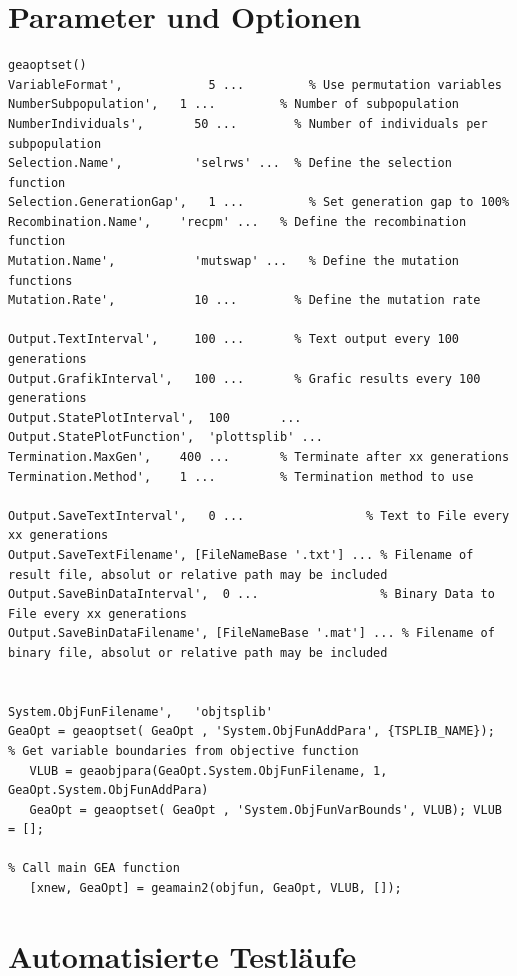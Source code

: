 \section{Parameter und Optionen}

\begin{lstlisting}
geaoptset()
VariableFormat',            5 ...         % Use permutation variables  
NumberSubpopulation',   1 ...         % Number of subpopulation
NumberIndividuals',       50 ...        % Number of individuals per subpopulation
Selection.Name',          'selrws' ...  % Define the selection function
Selection.GenerationGap',   1 ...         % Set generation gap to 100%   
Recombination.Name',    'recpm' ...   % Define the recombination function
Mutation.Name',           'mutswap' ...   % Define the mutation functions
Mutation.Rate',           10 ...        % Define the mutation rate                   

Output.TextInterval',     100 ...       % Text output every 100 generations
Output.GrafikInterval',   100 ...       % Grafic results every 100 generations
Output.StatePlotInterval',  100       ...
Output.StatePlotFunction',  'plottsplib' ...
Termination.MaxGen',    400 ...       % Terminate after xx generations
Termination.Method',    1 ...         % Termination method to use

Output.SaveTextInterval',   0 ...                 % Text to File every xx generations
Output.SaveTextFilename', [FileNameBase '.txt'] ... % Filename of result file, absolut or relative path may be included
Output.SaveBinDataInterval',  0 ...                 % Binary Data to File every xx generations
Output.SaveBinDataFilename', [FileNameBase '.mat'] ... % Filename of binary file, absolut or relative path may be included


System.ObjFunFilename',   'objtsplib'
GeaOpt = geaoptset( GeaOpt , 'System.ObjFunAddPara', {TSPLIB_NAME});
% Get variable boundaries from objective function
   VLUB = geaobjpara(GeaOpt.System.ObjFunFilename, 1, GeaOpt.System.ObjFunAddPara)
   GeaOpt = geaoptset( GeaOpt , 'System.ObjFunVarBounds', VLUB); VLUB = [];

% Call main GEA function
   [xnew, GeaOpt] = geamain2(objfun, GeaOpt, VLUB, []);
\end{lstlisting}


\section{Automatisierte Testläufe}\label{testlaeufe}

